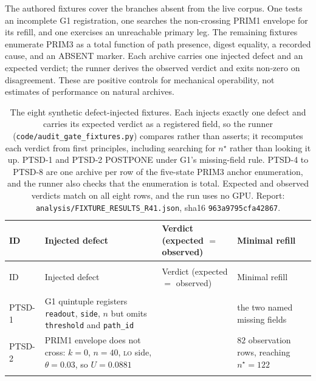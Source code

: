 \documentclass{article}
\begin{document}
The authored fixtures cover the branches absent from the live corpus. One tests an
incomplete G1 registration, one searches the non-crossing PRIM1 envelope for its refill,
and one exercises an unreachable primary leg. The remaining fixtures enumerate PRIM3 as a
total function of path presence, digest equality, a recorded cause, and an ABSENT marker.
Each archive carries one injected defect and an expected verdict; the runner derives the
observed verdict and exits non-zero on disagreement. These are positive controls for
mechanical operability, not estimates of performance on natural archives.

{
\setlength{\tabcolsep}{3pt}
\setlength{\LTcapwidth}{\linewidth}
\begin{longtable}{@{}>{\scriptsize}l Q{112pt} Q{128pt} Q{109pt}@{}}
\caption{The eight synthetic defect-injected fixtures. Each injects exactly one defect and
carries its expected verdict as a registered field, so the runner
(\texttt{code/audit\_gate\_fixtures.py}) compares rather than asserts; it recomputes each verdict
from first principles, including searching for $n^{\star}$ rather than looking it up. PTSD-1
and PTSD-2 POSTPONE under G1's missing-field rule. PTSD-4
to PTSD-8 are one archive per row of the five-state PRIM3 anchor enumeration, and the runner
also checks that the enumeration is total. Expected and observed verdicts match on all eight
rows, and the run uses no GPU. Report:
\texttt{analysis/FIXTURE\_RESULTS\_R41.json}, sha16 \texttt{963a9795cfa42867}.}
\label{tab:fixtures}\\
\toprule
ID & Injected defect & Verdict (expected ${}={}$ observed) & Minimal refill \\
\midrule
\endfirsthead
{}\\
\toprule
ID & Injected defect & Verdict (expected ${}={}$ observed) & Minimal refill \\
\midrule
\endhead
\midrule
{}\\
\endfoot
\bottomrule
\endlastfoot
PTSD-1 & G1 quintuple registers \texttt{readout}, \texttt{side}, $n$ but omits
  \texttt{threshold} and \texttt{path\_id} & 
  & the two named missing fields \\
\addlinespace[2pt]
PTSD-2 & PRIM1 envelope does not cross: $k=0$, $n=40$, \textsc{lo} side, $\theta=0.03$,
  so $U=0.0881$ & 
  & $82$ observation rows, reaching $n^{\star}=122$ \\
\addlinespace[2pt]

\end{longtable}}
\end{document}
